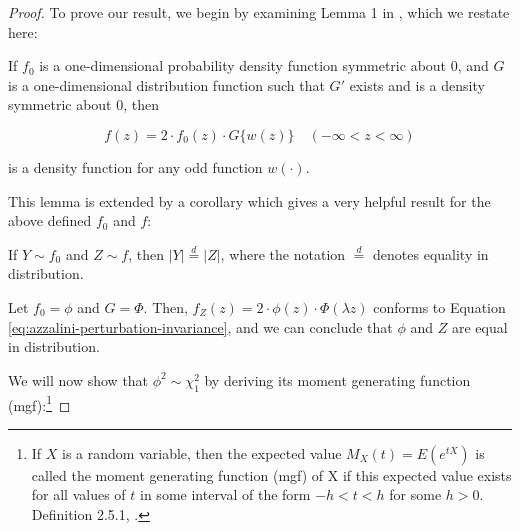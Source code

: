 \documentclass{article}
\begin{document}
\begin{proof}
  To prove our result, we begin by examining Lemma 1 in \citet{azzalini}, which
  we restate here:

  \begin{helper-lem}
    If $f_0$ is a one-dimensional probability density function symmetric about
    0, and $G$ is a one-dimensional distribution function such that $G'$ exists
    and is a density symmetric about 0, then

    \begin{equation}
      \label{eq:azzalini-perturbation-invariance}
      f(z) = 2 \cdot f_0(z) \cdot G\{w(z)\} \quad (-\infty < z < \infty)
    \end{equation}

    is a density function for any odd function $w(\cdot)$.
  \end{helper-lem}

  This lemma is extended by a corollary which gives a very helpful result for
  the above defined $f_0$ and $f$:

  \begin{helper-cor}
    If $Y \sim f_0$ and $Z \sim f$, then $|Y| \overset{d}{=} |Z|$, where the
    notation $\overset{d}{=}$ denotes equality in distribution.    
  \end{helper-cor}

  Let $f_0 = \phi$ and $G = \Phi$. Then, $f_Z(z) = 2 \cdot \phi(z) \cdot
  \Phi(\lambda z)$ conforms to Equation
  \eqref{eq:azzalini-perturbation-invariance}, and we can conclude that $\phi$
  and $Z$ are equal in distribution.

  We will now show that $\phi^2 \sim \chi^2_1$ by deriving its moment
  generating function (mgf):\footnote{If $X$ is a random variable, then the
  expected value $M_X(t) = E(e^{tX})$ is called the moment generating function
  (mgf) of X if this expected value exists for all values of $t$ in some
  interval of the form $-h < t < h$ for some $h > 0$. Definition 2.5.1,
  \citet{textbook}.}


\end{proof}
\end{document}
